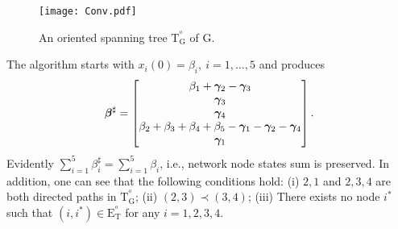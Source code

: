 \documentclass[a4paper, 11pt]{article}
\newcommand{\1}{\mathbf{1}}
\newcommand{\mG}{\mathrm{G}}
\newcommand{\mE}{\mathrm{E}}
\newcommand{\mT}{\mathrm{T}}
\newcommand{\mTG}{\mT^{^o}_{\mG}}
\newcommand{\mET}{\mE_{\mT}^{^o}}
\newcommand{\gammab}{{\bm \gamma}}
\newcommand{\betab}{\bm{\beta}}
\begin{document}
\begin{figure}[H]
	\centering
	\texttt{[image: Conv.pdf]}
	\caption{An oriented spanning tree $\mTG$ of $\mG$.}
	\label{fig:conv}
\end{figure}

The algorithm starts with $x_i(0)=\beta_i,\ i=1,\dots,5$ and produces
\begin{equation}\notag
\betab^\sharp=
\begin{bmatrix}
\beta_1+\gammab_2-\gammab_3 \\
\gammab_3 \\
\gammab_4 \\
\beta_2+\beta_3+\beta_4+\beta_5-\gammab_1-\gammab_2-\gammab_4 \\
\gammab_1
\end{bmatrix}.
\end{equation}
Evidently $\sum\limits_{i=1}^5 \beta^\sharp_i=\sum\limits_{i=1}^5 \beta_i$, i.e., network node states sum is preserved.
In addition, one can see that the following conditions hold: (i) $2,1$ and $2,3,4$ are both directed paths in $\mTG$; (ii) $(2,3)\prec(3,4)$; (iii) There exists no node $i^\ast$ such that $(i,i^\ast)\in\mET$ for any $i=1,2,3,4$.
\end{document}
